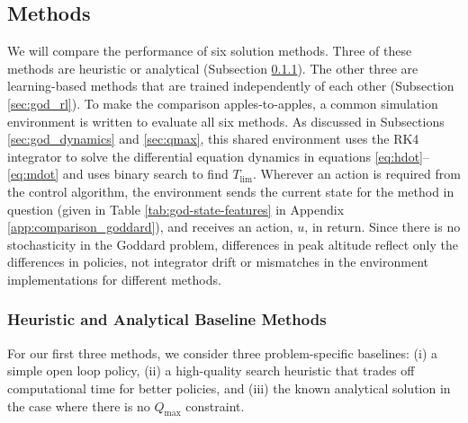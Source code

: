 \documentclass[mnsc,sglanonrev]{informs4}
\begin{document}
\subsection{Methods}
\label{sec:goddard_methods}

We will compare the performance of six solution methods. Three of these methods are heuristic or analytical (Subsection \ref{sec:god_baselines}). The other three are learning-based methods that are trained independently of each other (Subsection \ref{sec:god_rl}). To make the comparison apples-to-apples, a common simulation environment is written to evaluate all six methods. As discussed in Subsections \ref{sec:god_dynamics} and \ref{sec:qmax}, this shared environment uses the RK4 integrator to solve the differential equation dynamics in equations \eqref{eq:hdot}--\eqref{eq:mdot} and uses binary search to find $T_{\lim}$. Wherever an action is required from the control algorithm, the environment sends the current state for the method in question (given in Table \ref{tab:god-state-features} in Appendix \ref{app:comparison_goddard}), and receives an action, $u$, in return. Since there is no stochasticity in the Goddard problem, differences in peak altitude reflect only the differences in policies, not integrator drift or mismatches in the environment implementations for different methods.


\subsubsection{Heuristic and Analytical Baseline Methods}
\label{sec:god_baselines}

For our first three methods, we consider three problem-specific baselines: (i) a simple open loop policy, (ii) a high-quality search heuristic that trades off computational time for better policies, and (iii) the known analytical solution in the case where there is no $Q_{\max}$ constraint.
\end{document}

